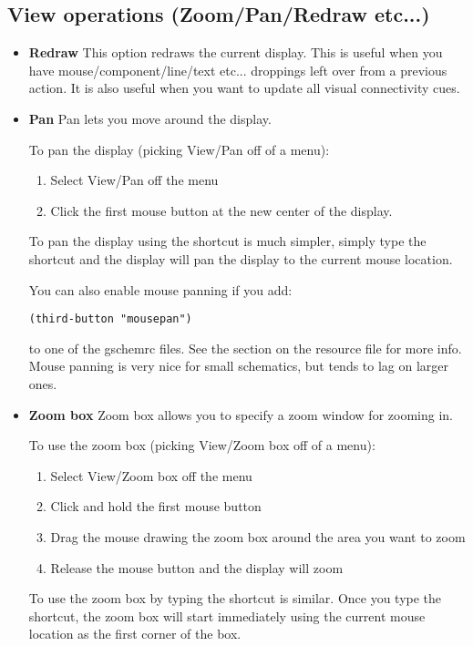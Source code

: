 \documentclass{article}
\begin{document}
\subsection{View operations (Zoom/Pan/Redraw etc...)}

\begin{itemize}
\item {\bf Redraw} This option redraws the current display.  This is
  useful when you have mouse/component/line/text etc... droppings left
  over from a previous action.  It is also useful when you want to
  update all visual connectivity cues.
  
\item {\bf Pan} Pan lets you move around the display.
  
  To pan the display (picking View/Pan off of a menu):
\begin{enumerate}
\item Select View/Pan off the menu
\item Click the first mouse button at the new center of the display.
\end{enumerate}  
  To pan the display using the shortcut is much simpler, simply type
  the shortcut and the display will pan the display to the current
  mouse location.
  
  You can also enable mouse panning if you add:
  
  {\tt (third-button "mousepan")}
  
  to one of the gschemrc files.  See the section on the resource file
  for more info.  Mouse panning is very nice for small schematics, but
  tends to lag on larger ones.
  
\item {\bf Zoom box} Zoom box allows you to specify a zoom window for
  zooming in.
        
  To use the zoom box (picking View/Zoom box off of a menu):
\begin{enumerate}
\item Select View/Zoom box off the menu
\item Click and hold the first mouse button
\item Drag the mouse drawing the zoom box around the area you want to
  zoom
\item Release the mouse button and the display will zoom
\end{enumerate}
To use the zoom box by typing the shortcut is similar.  Once you type
the shortcut, the zoom box will start immediately using the current
mouse location as the first corner of the box.


\end{itemize}
\end{document}
